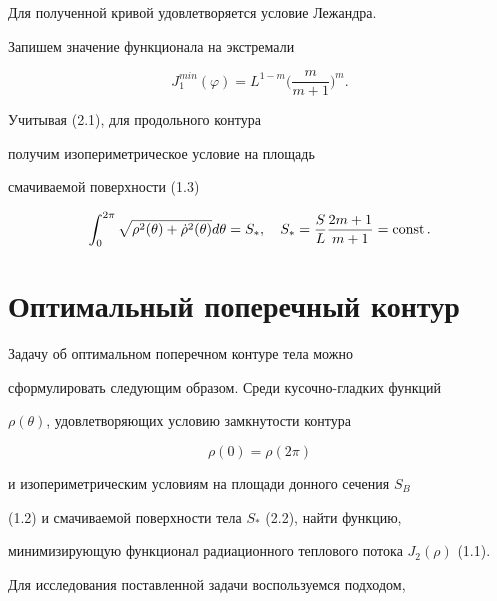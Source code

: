 Для полученной кривой удовлетворяется условие Лежандра.


Запишем значение функционала на экстремали


$$


J_1^{min} (\varphi) = L^{1-m} \bigg( \frac {m}{m+1} \bigg)^m.


$$





Учитывая (2.1), для продольного контура


получим изопериметрическое условие на площадь


смачиваемой поверхности (1.3)


\begin{equation}


\int_0^{2 \pi} \sqrt { \rho^2 (\theta) +


{\Dot{\rho}}^2 (\theta) } d\theta


= S_*,\quad


S_* = \frac {S}{L} \frac{2m+1}{m+1} = \const.


\end{equation}





\section{Оптимальный поперечный контур}





Задачу об оптимальном поперечном контуре тела можно


сформулировать следующим образом. Среди кусочно-гладких функций


$\rho (\theta)$, удовлетворяющих условию замкнутости контура


$$


\rho (0) = \rho (2 \pi)


$$


и изопериметрическим условиям на площади донного сечения $S_B$


(1.2) и смачиваемой поверхности тела $S_*$ (2.2), найти функцию,


минимизирующую функционал радиационного теплового потока $J_2


(\rho)$ (1.1).





Для исследования поставленной задачи воспользуемся подходом,



